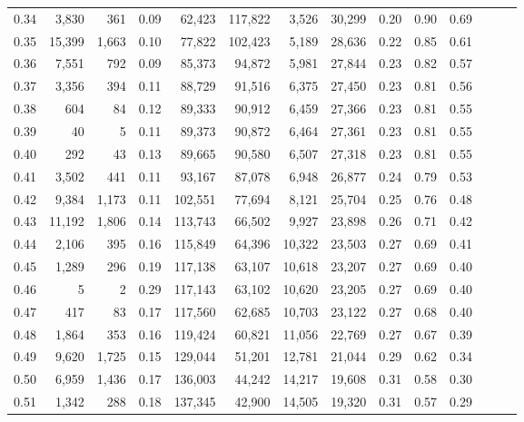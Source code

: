\begin{tabular}{rrrrrrrrrrrrrr}
0.34 &   3,830 &    361 &  0.09 &   62,423 &  117,822 &   3,526 &  30,299 &  0.20 &  0.90 &      0.69 \\
0.35 &  15,399 &  1,663 &  0.10 &   77,822 &  102,423 &   5,189 &  28,636 &  0.22 &  0.85 &      0.61 \\
0.36 &   7,551 &    792 &  0.09 &   85,373 &   94,872 &   5,981 &  27,844 &  0.23 &  0.82 &      0.57 \\
0.37 &   3,356 &    394 &  0.11 &   88,729 &   91,516 &   6,375 &  27,450 &  0.23 &  0.81 &      0.56 \\
0.38 &     604 &     84 &  0.12 &   89,333 &   90,912 &   6,459 &  27,366 &  0.23 &  0.81 &      0.55 \\
0.39 &      40 &      5 &  0.11 &   89,373 &   90,872 &   6,464 &  27,361 &  0.23 &  0.81 &      0.55 \\
0.40 &     292 &     43 &  0.13 &   89,665 &   90,580 &   6,507 &  27,318 &  0.23 &  0.81 &      0.55 \\
0.41 &   3,502 &    441 &  0.11 &   93,167 &   87,078 &   6,948 &  26,877 &  0.24 &  0.79 &      0.53 \\
0.42 &   9,384 &  1,173 &  0.11 &  102,551 &   77,694 &   8,121 &  25,704 &  0.25 &  0.76 &      0.48 \\
0.43 &  11,192 &  1,806 &  0.14 &  113,743 &   66,502 &   9,927 &  23,898 &  0.26 &  0.71 &      0.42 \\
0.44 &   2,106 &    395 &  0.16 &  115,849 &   64,396 &  10,322 &  23,503 &  0.27 &  0.69 &      0.41 \\
0.45 &   1,289 &    296 &  0.19 &  117,138 &   63,107 &  10,618 &  23,207 &  0.27 &  0.69 &      0.40 \\
0.46 &       5 &      2 &  0.29 &  117,143 &   63,102 &  10,620 &  23,205 &  0.27 &  0.69 &      0.40 \\
0.47 &     417 &     83 &  0.17 &  117,560 &   62,685 &  10,703 &  23,122 &  0.27 &  0.68 &      0.40 \\
0.48 &   1,864 &    353 &  0.16 &  119,424 &   60,821 &  11,056 &  22,769 &  0.27 &  0.67 &      0.39 \\
0.49 &   9,620 &  1,725 &  0.15 &  129,044 &   51,201 &  12,781 &  21,044 &  0.29 &  0.62 &      0.34 \\
0.50 &   6,959 &  1,436 &  0.17 &  136,003 &   44,242 &  14,217 &  19,608 &  0.31 &  0.58 &      0.30 \\
0.51 &   1,342 &    288 &  0.18 &  137,345 &   42,900 &  14,505 &  19,320 &  0.31 &  0.57 &      0.29 \\

\end{tabular}
